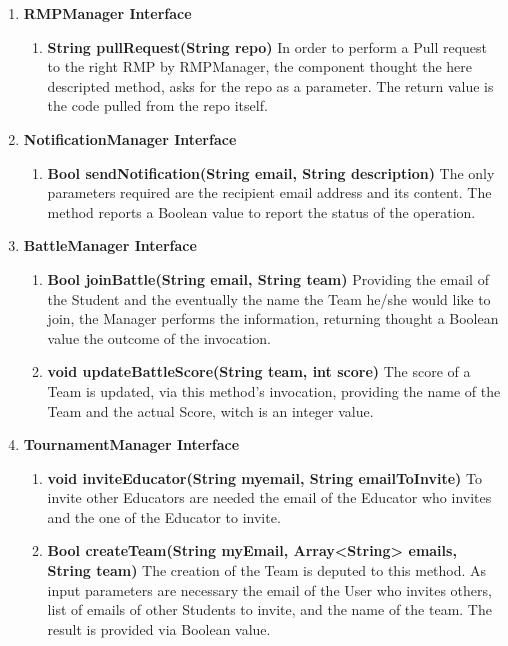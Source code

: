 \begin{enumerate}
    \item \textbf{RMPManager Interface}
        \begin{enumerate}[label=$\bullet$]
            \item \textbf{String pullRequest(String repo)} In order to perform a Pull request to the right RMP by RMPManager, the component thought the here descripted method, asks for the repo as a parameter. The return value is the code pulled from the repo itself.
        \end{enumerate} 
    \item \textbf{NotificationManager Interface}
        \begin{enumerate}[label=$\bullet$]
            \item \textbf{Bool sendNotification(String email, String description)} The only parameters required are the recipient email address and its content. The method reports a Boolean value to report the status of the operation.
        \end{enumerate}
    \item \textbf{BattleManager Interface}
        \begin{enumerate}[label=$\bullet$]
            \item \textbf{Bool joinBattle(String email, String team)} Providing the email of the Student and the eventually the name the Team he/she would like to join, the Manager performs the information, returning thought a Boolean value the outcome of the invocation.
            \item \textbf{void updateBattleScore(String team, int score)} The score of a Team is updated, via this method's invocation, providing the name of the Team and the actual Score, witch is an integer value.
        \end{enumerate}
    \item \textbf{TournamentManager Interface}
        \begin{enumerate}[label=$\bullet$]
        \item \textbf{void inviteEducator(String myemail, String emailToInvite)} To invite other Educators are needed the email of the Educator who invites and the one of the Educator to invite.
        \item \textbf{Bool createTeam(String myEmail, Array<String> emails, String team)} The creation of the Team is deputed to this method. As input parameters are necessary the email of the User who invites others, list of emails of other Students to invite, and the name of the team. The result is provided via Boolean value. 

\end{enumerate}
\end{enumerate}
